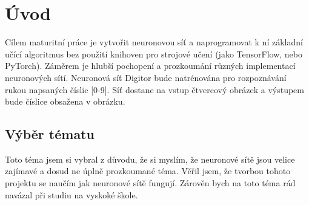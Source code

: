 \section{Úvod}
Cílem maturitní práce je vytvořit neuronovou síť a naprogramovat k ní základní učící algoritmus bez použití knihoven pro strojové učení (jako TensorFlow, nebo PyTorch).
Záměrem je hlubší pochopení a prozkoumání různých implementací neuronových sítí.
Neuronová síť Digitor bude natrénována pro rozpoznávání rukou napsaných číslic [0-9].
Síť dostane na vstup čtvercový obrázek a výstupem bude číslice obsažena v obrázku.

\subsection{Výběr tématu}
Toto téma jsem si vybral z důvodu, že si myslím, že neuronové sítě jsou velice zajímavé a dosud ne úplně prozkoumané téma.
Věřil jsem, že tvorbou tohoto projektu se naučím jak neuronové sítě fungují.
Zárověn bych na toto téma rád navázal při studiu na vyskoké škole.